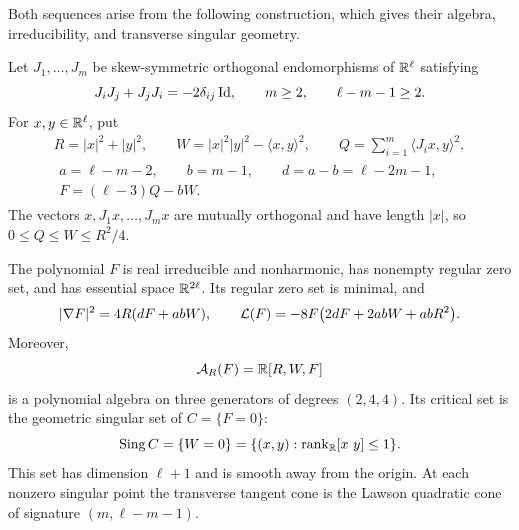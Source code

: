 Both sequences arise from the following construction, which gives
their algebra, irreducibility, and transverse singular geometry.

Let $J_1,\ldots,J_m$ be skew-symmetric orthogonal endomorphisms of
$\mathbb R^\ell$ satisfying
\[
 J_iJ_j+J_jJ_i=-2\delta_{ij}\operatorname{Id},
 \qquad m\ge2,\qquad\ell-m-1\ge2.
\]
For $x,y\in\mathbb R^\ell$, put
\begin{gather}
 R=|x|^2+|y|^2,\qquad
 W=|x|^2|y|^2-\langle x,y\rangle^2,\qquad
 Q=\sum_{i=1}^m\langle J_ix,y\rangle^2,
 \label{eq:orthq-data}\\
 \begin{gathered}
 a=\ell-m-2,\qquad b=m-1,\qquad d=a-b=\ell-2m-1,\\
 F=(\ell-3)Q-bW.
 \end{gathered}
 \label{eq:orthq-polynomial}
\end{gather}
The vectors $x,J_1x,\ldots,J_mx$ are mutually orthogonal and have
length $|x|$, so $0\le Q\le W\le R^2/4$.

\begin{proposition}
\label{prop:orthq-construction}
The polynomial $F$ is real irreducible and nonharmonic, has nonempty
regular zero set, and has essential space $\mathbb R^{2\ell}$.
Its regular zero set is minimal, and
\begin{equation}\label{eq:orthq-minimality}
 |\nabla F|^2=4R(dF+abW),\qquad
 \mathcal L(F)=-8F\bigl(2dF+2abW+abR^2\bigr).
\end{equation}
Moreover,
\[
 \mathcal A_R(F)=\mathbb R[R,W,F]
\]
is a polynomial algebra on three generators of degrees $(2,4,4)$.
Its critical set is the geometric singular set of $C=\{F=0\}$:
\begin{equation}\label{eq:orthq-singular}
 \operatorname{Sing} C=\{W=0\}
 =\{(x,y):\operatorname{rank}_{\mathbb R}[x\ y]\le1\}.
\end{equation}
This set has dimension $\ell+1$ and is smooth away from the origin.
At each nonzero singular point the transverse tangent cone is the
Lawson quadratic cone of signature $(m,\ell-m-1)$.
\end{proposition}

